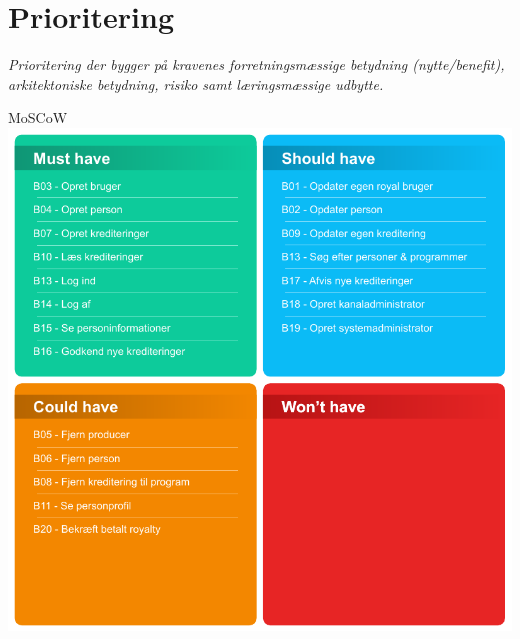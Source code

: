 \section{Prioritering}
\textit{Prioritering der bygger på kravenes forretningsmæssige betydning (nytte/benefit), arkitektoniske betydning, risiko samt læringsmæssige udbytte.}

\noindent
MoSCoW \\

\includegraphics[scale=1]{figures/MoSCoW.pdf}